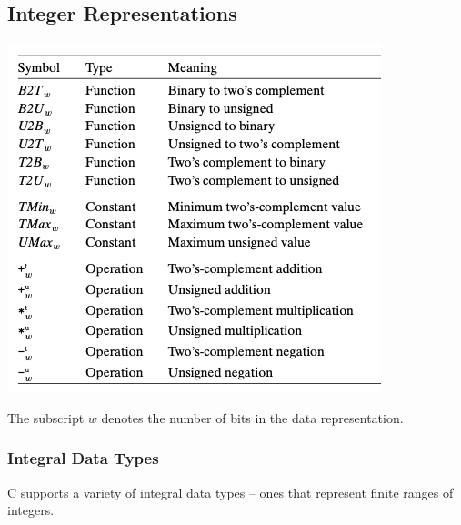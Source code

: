 \documentclass[11pt]{article}
\begin{document}
\subsection{Integer Representations}
\label{sec:orge324b6d}

\begin{center}
\includegraphics[width=.9\linewidth]{pics/terminology.png}
\end{center}
The subscript \(w\) denotes the number of bits in the data representation.\\


\subsubsection{Integral Data Types}
\label{sec:orgea911de}
C supports a variety of integral data types -- ones that represent finite ranges of integers.\\
\end{document}
